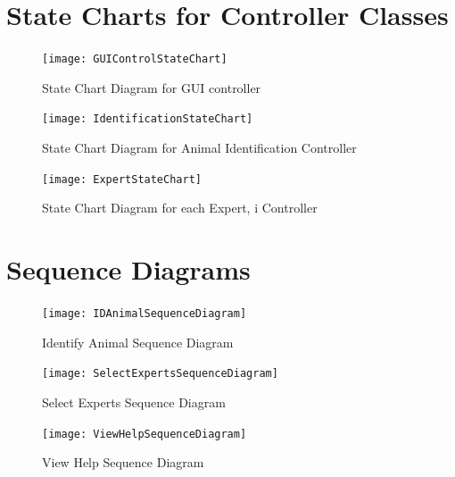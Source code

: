 \documentclass[]{article}
\begin{document}


\section{State Charts for Controller Classes}
\label{sec:state_charts_for_controller_classes}
\begin{figure}[H]
	\centering
	\texttt{[image: GUIControlStateChart]}
	\caption{State Chart Diagram for GUI controller}
	\label{State Chart Diagram for GUI controller}
\end{figure}

\begin{figure}[H]
	\centering
	\texttt{[image: IdentificationStateChart]}
	\caption{State Chart Diagram for Animal Identification Controller}
	\label{State Chart Diagram for Animal Identification Controller}
\end{figure}

\begin{figure}[H]
	\centering
	\texttt{[image: ExpertStateChart]}
	\caption{State Chart Diagram for each Expert, i Controller}
	\label{State Chart Diagram for each Expert, i Controller}
\end{figure}


\section{Sequence Diagrams}
\label{sec:sequence_diagrams}
\begin{figure}[H]
	\centering
	\texttt{[image: IDAnimalSequenceDiagram]}
	\caption{Identify Animal Sequence Diagram}
	\label{Identify Animal Sequence Diagram}
\end{figure}

\begin{figure}[H]
	\centering
	\texttt{[image: SelectExpertsSequenceDiagram]}
	\caption{Select Experts Sequence Diagram}
	\label{Select Experts Sequence Diagram}
\end{figure}

\begin{figure}[H]
	\centering
	\texttt{[image: ViewHelpSequenceDiagram]}
	\caption{View Help Sequence Diagram}
	\label{View Help Sequence Diagram}
\end{figure}
\end{document}
